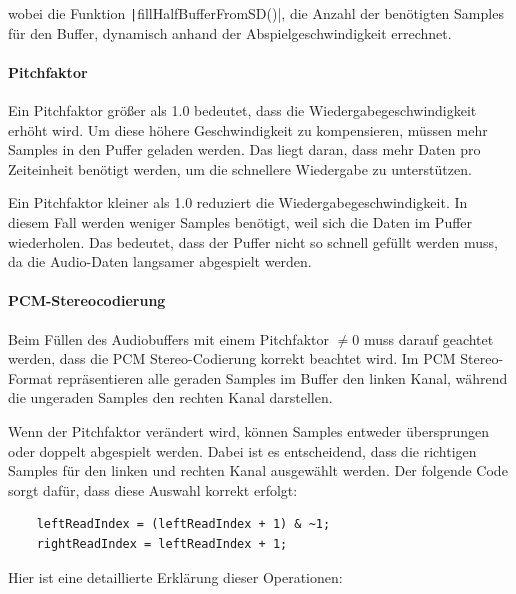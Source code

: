 wobei die Funktion \texttt|fillHalfBufferFromSD()|, die Anzahl der benötigten Samples für den Buffer, dynamisch anhand der Abspielgeschwindigkeit errechnet.

\paragraph{Pitchfaktor}

Ein Pitchfaktor größer als 1.0 bedeutet, dass die Wiedergabegeschwindigkeit erhöht wird. Um diese höhere Geschwindigkeit zu kompensieren, müssen mehr Samples in den Puffer geladen werden. Das liegt daran, dass mehr Daten pro Zeiteinheit benötigt werden, um die schnellere Wiedergabe zu unterstützen.

Ein Pitchfaktor kleiner als 1.0 reduziert die Wiedergabegeschwindigkeit. In diesem Fall werden weniger Samples benötigt, weil sich die Daten im Puffer wiederholen. Das bedeutet, dass der Puffer nicht so schnell gefüllt werden muss, da die Audio-Daten langsamer abgespielt werden.

\paragraph{PCM-Stereocodierung}

Beim Füllen des Audiobuffers mit einem Pitchfaktor \( \neq 0 \) muss darauf geachtet werden, dass die PCM Stereo-Codierung korrekt beachtet wird. 
Im PCM Stereo-Format repräsentieren alle geraden Samples im Buffer den linken Kanal, während die ungeraden Samples den rechten Kanal darstellen.

Wenn der Pitchfaktor verändert wird, können Samples entweder übersprungen oder doppelt abgespielt werden. Dabei ist es entscheidend, dass die richtigen Samples für den linken und rechten Kanal ausgewählt werden. Der folgende Code sorgt dafür, dass diese Auswahl korrekt erfolgt:

\begin{verbatim}
	leftReadIndex = (leftReadIndex + 1) & ~1;
	rightReadIndex = leftReadIndex + 1;
\end{verbatim}


\noindent
Hier ist eine detaillierte Erklärung dieser Operationen:

